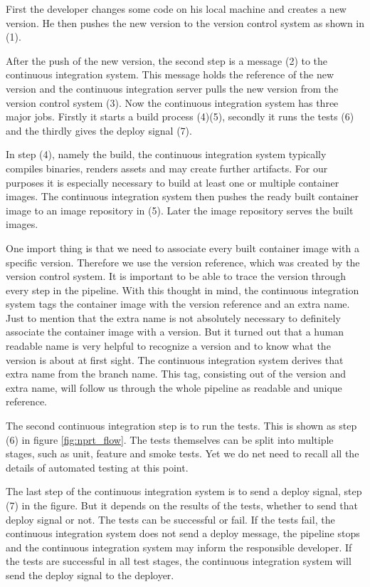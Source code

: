 First the developer changes some code on his local machine and creates a new version. He
then pushes the new version to the version control system as shown in (1).

After the push of the new version, the second step is a message (2) to the continuous
integration system. This message holds the reference of the new version and the continuous
integration server pulls the new version from the version control system (3). Now the
continuous integration system has three major jobs. Firstly it starts a build process
(4)(5), secondly it runs the tests (6) and the thirdly gives the deploy signal (7).

In step (4), namely the build, the continuous integration system typically compiles
binaries, renders assets and may create further artifacts. For our purposes it is
especially necessary to build at least one or multiple container images. The continuous
integration system then pushes the ready built container image to an image repository in
(5). Later the image repository serves the built images.

One import thing is that we need to associate every built container image with a specific
version. Therefore we use the version reference, which was created by the version control
system. It is important to be able to trace the version through every step in the
pipeline. With this thought in mind, the continuous integration system tags the container
image with the version reference and an extra name. Just to mention that the extra name is
not absolutely necessary to definitely associate the container image with a version. But
it turned out that a human readable name is very helpful to recognize a version and to
know what the version is about at first sight. The continuous integration system derives
that extra name from the branch name. This tag, consisting out of the version and extra
name, will follow us through the whole pipeline as readable and unique reference.

The second continuous integration step is to run the tests. This is shown as step (6) in
figure \ref{fig:nprt_flow}. The tests themselves can be split into multiple stages, such
as unit, feature and smoke tests. Yet we do net need to recall all the details of
automated testing at this point.

The last step of the continuous integration system is to send a deploy signal, step (7) in
the figure. But it depends on the results of the tests, whether to send that deploy signal
or not. The tests can be successful or fail. If the tests fail, the continuous integration
system does not send a deploy message, the pipeline stops and the continuous integration
system may inform the responsible developer. If the tests are successful in all test
stages, the continuous integration system will send the deploy signal to the deployer.

